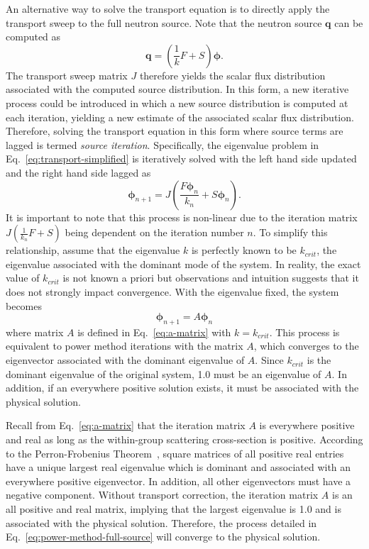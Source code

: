 An alternative way to solve the transport equation is to directly apply the transport sweep to the full neutron source. Note that the neutron source $\mathbf{q}$ can be computed as 
\begin{equation*}
	\mathbf{q} = \left(\frac{1}{k} F + S \right) \boldsymbol{\phi}. 
\end{equation*}
The transport sweep matrix $J$ therefore yields the scalar flux distribution associated with the computed source distribution. In this form, a new iterative process could be introduced in which a new source distribution is computed at each iteration, yielding a new estimate of the associated scalar flux distribution. Therefore, solving the transport equation in this form where source terms are lagged is termed \textit{source iteration}.  Specifically, the eigenvalue problem in Eq.~\ref{eq:transport-simplified} is iteratively solved with the left hand side updated and the right hand side lagged as
\begin{equation}
	\boldsymbol{\phi}_{n+1} =  J\left(\frac{F\boldsymbol{\phi}_n}{k_n} + S\boldsymbol{\phi}_n\right).
	\label{eq:power-method-full-source}
\end{equation}
It is important to note that this process is non-linear due to the iteration matrix $J\left(\frac{1}{k_n} F + S\right)$ being dependent on the iteration number $n$. To simplify this relationship, assume that the eigenvalue $k$ is perfectly known to be $k_{\textit{crit}}$, the eigenvalue associated with the dominant mode of the system. In reality, the exact value of $k_{\textit{crit}}$ is not known a priori but observations and intuition suggests that it does not strongly impact convergence. With the eigenvalue fixed, the system becomes 
\begin{equation}
	\boldsymbol{\phi}_{n+1} =  A \boldsymbol{\phi}_n
\end{equation}
where matrix $A$ is defined in Eq.~\ref{eq:a-matrix} with $k = k_{\textit{crit}}$. This process is equivalent to power method iterations with the matrix $A$, which converges to the eigenvector associated with the dominant eigenvalue of $A$. Since $k_{\textit{crit}}$ is the dominant eigenvalue of the original system, 1.0 must be an eigenvalue of $A$. In addition, if an everywhere positive solution exists, it must be associated with the physical solution.

Recall from Eq.~\ref{eq:a-matrix} that the iteration matrix $A$ is everywhere positive and real as long as the within-group scattering cross-section is positive. According to the Perron-Frobenius Theorem~\cite{perron-frobenius}, square matrices of all positive real entries have a unique largest real eigenvalue which is dominant and associated with an everywhere positive eigenvector. In addition, all other eigenvectors must have a negative component. Without transport correction, the iteration matrix $A$ is an all positive and real matrix, implying that the largest eigenvalue is 1.0 and is associated with the physical solution. Therefore, the process detailed in Eq.~\ref{eq:power-method-full-source} will converge to the physical solution.

